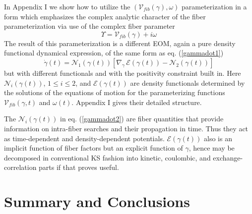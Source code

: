 \documentclass[aps,preprint]{revtex4}%
\begin{document}
In Appendix I we show how to utilize the $\left(  \mathcal{V}_{fib}%
(\gamma),\omega\right)  $ parameterization in a form which emphasizes the
complex analytic character of the fiber parameterization via use of the
complex fiber parameter
\begin{equation}
\Upsilon=\mathcal{V}_{fib}(\gamma)+i\omega\label{Ffactor}%
\end{equation}
The result of this parameterization is a different EOM, again a pure density
functional dynamical expression, of the same form as eq. (\ref{gammadot1})
\begin{equation}
\dot{\gamma}(t)=\mathcal{N}_{1}(\gamma(t))\left[  \nabla_{\gamma}%
\,\mathcal{E}(\gamma(t))-\mathcal{N}_{2}(\gamma(t))\right]  \label{gammadot2}%
\end{equation}
but with different functionals and with the positivity constraint built in.
Here $\mathcal{N}_{i}(\gamma(t))$, $1\leq i\leq2$, and $\mathcal{E}%
(\gamma(t))$ are density functionals determined by the solutions of the
equations of motion for the parameterizing functions $\mathcal{V}_{fib}%
(\gamma,t)$ and $\omega(t)$. Appendix I gives their detailed structure.

The $\mathcal{N}_{i}(\gamma(t))$ in eq. (\ref{gammadot2}) are fiber quantities
that provide information on intra-fiber searches and their propagation in
time. Thus they act as time-dependent and density-dependent potentials.
$\mathcal{E}(\gamma(t))$ also is an implicit function of fiber factors but an
explicit function of $\gamma$, hence may be decomposed in conventional KS
fashion into kinetic, coulombic, and exchange-correlation parts if that proves useful.

\section{Summary and Conclusions}
\end{document}
